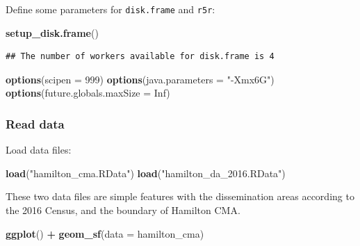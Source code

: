 \documentclass[
]{article}
\newenvironment{Shaded}{\begin{snugshade}}{\end{snugshade}}
\newcommand{\DataTypeTok}[1]{\textcolor[rgb]{0.13,0.29,0.53}{#1}}
\newcommand{\DecValTok}[1]{\textcolor[rgb]{0.00,0.00,0.81}{#1}}
\newcommand{\KeywordTok}[1]{\textcolor[rgb]{0.13,0.29,0.53}{\textbf{#1}}}
\newcommand{\NormalTok}[1]{#1}
\newcommand{\OperatorTok}[1]{\textcolor[rgb]{0.81,0.36,0.00}{\textbf{#1}}}
\newcommand{\OtherTok}[1]{\textcolor[rgb]{0.56,0.35,0.01}{#1}}
\newcommand{\StringTok}[1]{\textcolor[rgb]{0.31,0.60,0.02}{#1}}
\begin{document}
Define some parameters for \texttt{disk.frame} and \texttt{r5r}:

\begin{Shaded}
\begin{Highlighting}[]
\KeywordTok{setup_disk.frame}\NormalTok{()}
\end{Highlighting}
\end{Shaded}

\begin{verbatim}
## The number of workers available for disk.frame is 4
\end{verbatim}

\begin{Shaded}
\begin{Highlighting}[]
\KeywordTok{options}\NormalTok{(}\DataTypeTok{scipen =} \DecValTok{999}\NormalTok{)}
\KeywordTok{options}\NormalTok{(}\DataTypeTok{java.parameters =} \StringTok{"-Xmx6G"}\NormalTok{)}
\KeywordTok{options}\NormalTok{(}\DataTypeTok{future.globals.maxSize =} \OtherTok{Inf}\NormalTok{)}
\end{Highlighting}
\end{Shaded}

\hypertarget{read-data}{%
\subsubsection{Read data}\label{read-data}}

Load data files:

\begin{Shaded}
\begin{Highlighting}[]
\KeywordTok{load}\NormalTok{(}\StringTok{"hamilton_cma.RData"}\NormalTok{)}
\KeywordTok{load}\NormalTok{(}\StringTok{"hamilton_da_2016.RData"}\NormalTok{)}
\end{Highlighting}
\end{Shaded}

These two data files are simple features with the dissemination areas
according to the 2016 Census, and the boundary of Hamilton CMA.

\begin{Shaded}
\begin{Highlighting}[]
\KeywordTok{ggplot}\NormalTok{() }\OperatorTok{+}
\StringTok{  }\KeywordTok{geom_sf}\NormalTok{(}\DataTypeTok{data =}\NormalTok{ hamilton_cma)}
\end{Highlighting}
\end{Shaded}
\end{document}
